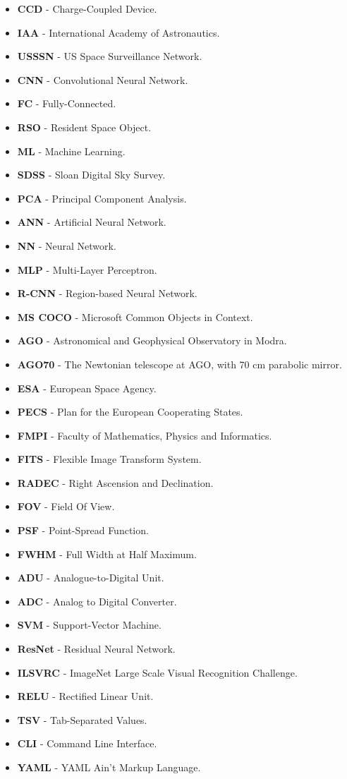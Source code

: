 \begin{itemize}
    \setlength\itemsep{1px}
    \item \textbf{CCD} - Charge-Coupled Device.
    \item \textbf{IAA} - International Academy of Astronautics. 
    \item \textbf{USSSN} - US Space Surveillance Network.
    \item \textbf{CNN} - Convolutional Neural Network.
    \item \textbf{FC} - Fully-Connected. 
    \item \textbf{RSO} - Resident Space Object.
    \item \textbf{ML} - Machine Learning.
    \item \textbf{SDSS} - Sloan Digital Sky Survey.
    \item \textbf{PCA} - Principal Component Analysis.
    \item \textbf{ANN} - Artificial Neural Network.
    \item \textbf{NN} - Neural Network.
    \item \textbf{MLP} - Multi-Layer Perceptron.
    \item \textbf{R-CNN} - Region-based Neural Network. 
    \item \textbf{MS COCO} - Microsoft Common Objects in Context. 
    \item \textbf{AGO} - Astronomical and Geophysical Observatory in Modra. 
    \item \textbf{AGO70} - The Newtonian telescope at AGO, with 70 cm parabolic mirror. 
    \item \textbf{ESA} - European Space Agency. 
    \item \textbf{PECS} - Plan for the European Cooperating States.
    \item \textbf{FMPI} - Faculty of Mathematics, Physics and Informatics.
    \item \textbf{FITS} - Flexible Image Transform System. 
    \item \textbf{RADEC} - Right Ascension and Declination.
     \item \textbf{FOV} - Field Of View.  
    \item \textbf{PSF} - Point-Spread Function.
    \item \textbf{FWHM} - Full Width at Half Maximum.
    \item \textbf{ADU} - Analogue-to-Digital Unit.
    \item \textbf{ADC} - Analog to Digital Converter.
    \item \textbf{SVM} - Support-Vector Machine.
    \item \textbf{ResNet} - Residual Neural Network.
    \item \textbf{ILSVRC} - ImageNet Large Scale Visual Recognition Challenge.
    \item \textbf{RELU} - Rectified Linear Unit. 
    \item \textbf{TSV} - Tab-Separated Values. 
    \item \textbf{CLI} - Command Line Interface.
    \item \textbf{YAML} - YAML Ain't Markup Language. 
\end{itemize}



